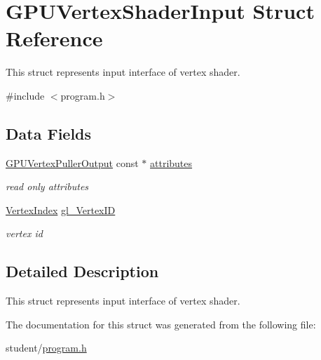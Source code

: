 \hypertarget{structGPUVertexShaderInput}{\section{G\-P\-U\-Vertex\-Shader\-Input Struct Reference}
\label{structGPUVertexShaderInput}
}


This struct represents input interface of vertex shader.  




{\ttfamily \#include $<$program.\-h$>$}

\subsection*{Data Fields}
\begin{DoxyCompactItemize}
\item 
\hypertarget{structGPUVertexShaderInput_a01f1182e46873cccea824f74f0545adf}{\hyperlink{structGPUVertexPullerOutput}{G\-P\-U\-Vertex\-Puller\-Output} const $\ast$ \hyperlink{structGPUVertexShaderInput_a01f1182e46873cccea824f74f0545adf}{attributes}}\label{structGPUVertexShaderInput_a01f1182e46873cccea824f74f0545adf}

\begin{DoxyCompactList}\small\item\em read only attributes \end{DoxyCompactList}\item 
\hypertarget{structGPUVertexShaderInput_a4f3129bf519e2153b77ac5bbd15ea990}{\hyperlink{fwd_8h_a83b6b93a31d7fa3fc22f37a3a0798858}{Vertex\-Index} \hyperlink{structGPUVertexShaderInput_a4f3129bf519e2153b77ac5bbd15ea990}{gl\-\_\-\-Vertex\-I\-D}}\label{structGPUVertexShaderInput_a4f3129bf519e2153b77ac5bbd15ea990}

\begin{DoxyCompactList}\small\item\em vertex id \end{DoxyCompactList}\end{DoxyCompactItemize}


\subsection{Detailed Description}
This struct represents input interface of vertex shader. 

The documentation for this struct was generated from the following file\-:\begin{DoxyCompactItemize}
\item 
student/\hyperlink{program_8h}{program.\-h}\end{DoxyCompactItemize}
